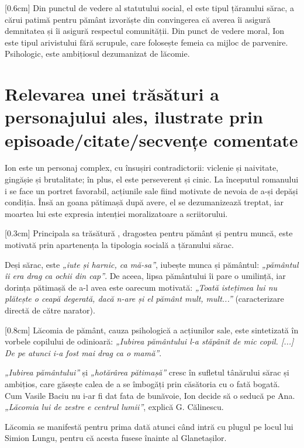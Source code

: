 \documentclass[
12pt,
a4paper
]{article}
\begin{document}
[0.6cm]
Din punctul de vedere al statutului social, el este tipul țăranului sărac, a cărui patimă pentru pământ izvorăște din convingerea  că averea îi asigură demnitatea și îi asigură respectul comunității. Din punct de vedere moral, Ion este tipul arivistului fără scrupule, care folosește femeia ca mijloc de parvenire. Psihologic, este ambițiosul dezumanizat de lăcomie.

\section{Relevarea unei trăsături a personajului ales, ilustrate prin episoade/citate/secvențe comentate}

Ion este un personaj complex, cu însușiri contradictorii: viclenie și naivitate, gingășie și brutalitate; în plus, el este perseverent și cinic. La începutul romanului i se face un portret favorabil, acțiunile sale fiind motivate de nevoia de a-și depăși condiția. Însă an goana pătimașă după avere, el se dezumanizează treptat, iar moartea lui este expresia intenției moralizatoare a scriitorului.

[0.3cm]
Principala sa trăsătură , dragostea pentru pământ și pentru muncă, este motivată prin apartenența la tipologia socială a țăranului sărac.

Deși sărac, este \textit{„iute și harnic, ca mă-sa”}, iubește munca și pământul: \textit{„pământul îi era drag ca ochii din cap”}. De aceea, lipsa pământului îi pare o umilință, iar dorința pătimașă de a-l avea este oarecum motivată: \textit{„Toată istețimea lui nu plătește o ceapă degerată, dacă n-are și el pământ mult, mult...”} (caracterizare directă de către narator).

[0.8cm]
Lăcomia de pământ, cauza psihologică a acțiunilor sale, este sintetizată în vorbele copilului de odinioară: \textit{„Iubirea pământului l-a stăpânit de mic copil. [...] De pe atunci i-a fost mai drag ca o mamă”}.

\textit{„Iubirea pământului”} și \textit{„hotărârea pătimașă”} cresc în sufletul tânărului sărac și ambițios, care găsește calea de a se îmbogăți prin căsătoria cu o fată bogată. Cum Vasile Baciu nu i-ar fi dat fata de bunăvoie, Ion decide să o seducă pe Ana. \textit{„Lăcomia lui de zestre e centrul lumii”}, explică G. Călinescu.

Lăcomia se manifestă pentru prima dată atunci când intră cu plugul pe locul lui Simion Lungu, pentru că acesta fusese înainte al Glanetașilor.
\end{document}
